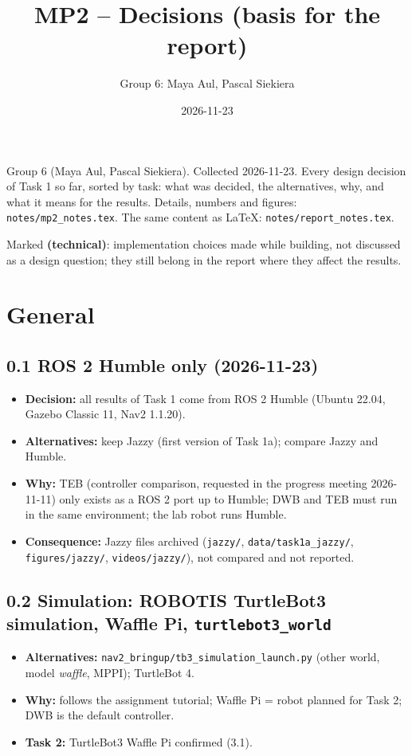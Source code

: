 \documentclass[10pt]{article}
\title{MP2 -- Decisions (basis for the report)}
\author{Group 6: Maya Aul, Pascal Siekiera}
\date{2026-11-23}
\newcommand{\pkg}[1]{\texttt{#1}}
\begin{document}
\maketitle
Group 6 (Maya Aul, Pascal Siekiera). Collected 2026-11-23. Every design decision of Task 1 so far,
sorted by task: what was decided, the alternatives, why, and what it means for the results.
Details, numbers and figures: \pkg{notes/mp2\_notes.tex}. The same content as LaTeX: \pkg{notes/report\_notes.tex}.

Marked \textbf{(technical)}: implementation choices made while building, not discussed as a design
question; they still belong in the report where they affect the results.

\section{General}

\subsection*{0.1 ROS 2 Humble only (2026-11-23)}
\begin{itemize}
  \item \textbf{Decision:} all results of Task 1 come from ROS 2 Humble (Ubuntu 22.04, Gazebo Classic 11, Nav2 1.1.20).
  \item \textbf{Alternatives:} keep Jazzy (first version of Task 1a); compare Jazzy and Humble.
  \item \textbf{Why:} TEB (controller comparison, requested in the progress meeting 2026-11-11) only exists as a ROS 2 port up to Humble; DWB and TEB must run in the same environment; the lab robot runs Humble.
  \item \textbf{Consequence:} Jazzy files archived (\pkg{jazzy/}, \pkg{data/task1a\_jazzy/}, \pkg{figures/jazzy/}, \pkg{videos/jazzy/}), not compared and not reported.
\end{itemize}

\subsection*{0.2 Simulation: ROBOTIS TurtleBot3 simulation, Waffle Pi, \pkg{turtlebot3\_world}}
\begin{itemize}
  \item \textbf{Alternatives:} \pkg{nav2\_bringup/tb3\_simulation\_launch.py} (other world, model \emph{waffle}, MPPI); TurtleBot 4.
  \item \textbf{Why:} follows the assignment tutorial; Waffle Pi = robot planned for Task 2; DWB is the default controller.
  \item \textbf{Task 2:} TurtleBot3 Waffle Pi confirmed (3.1).
\end{itemize}
\end{document}
